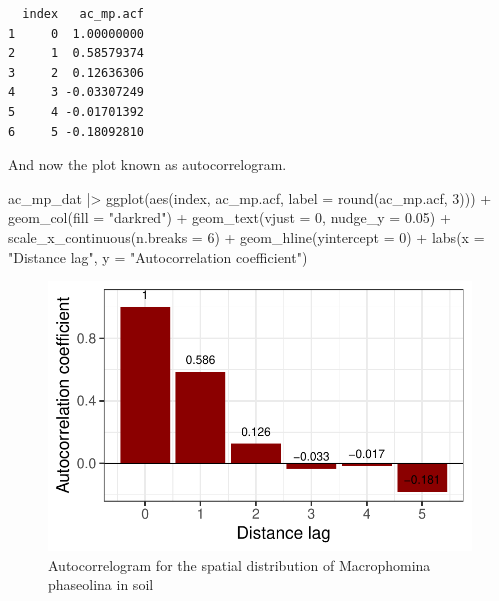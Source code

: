 \documentclass[
  letterpaper,
  DIV=11,
  numbers=noendperiod]{scrreprt}
\newenvironment{Shaded}{\begin{snugshade}}{\end{snugshade}}
\newcommand{\AttributeTok}[1]{\textcolor[rgb]{0.40,0.45,0.13}{#1}}
\newcommand{\DecValTok}[1]{\textcolor[rgb]{0.68,0.00,0.00}{#1}}
\newcommand{\FloatTok}[1]{\textcolor[rgb]{0.68,0.00,0.00}{#1}}
\newcommand{\FunctionTok}[1]{\textcolor[rgb]{0.28,0.35,0.67}{#1}}
\newcommand{\NormalTok}[1]{\textcolor[rgb]{0.00,0.23,0.31}{#1}}
\newcommand{\SpecialCharTok}[1]{\textcolor[rgb]{0.37,0.37,0.37}{#1}}
\newcommand{\StringTok}[1]{\textcolor[rgb]{0.13,0.47,0.30}{#1}}
\begin{document}
\begin{verbatim}
  index   ac_mp.acf
1     0  1.00000000
2     1  0.58579374
3     2  0.12636306
4     3 -0.03307249
5     4 -0.01701392
6     5 -0.18092810
\end{verbatim}

And now the plot known as autocorrelogram.

\begin{Shaded}
\begin{Highlighting}[]
\NormalTok{ac\_mp\_dat }\SpecialCharTok{|\textgreater{}}
  \FunctionTok{ggplot}\NormalTok{(}\FunctionTok{aes}\NormalTok{(index, ac\_mp.acf, }\AttributeTok{label =} \FunctionTok{round}\NormalTok{(ac\_mp.acf, }\DecValTok{3}\NormalTok{))) }\SpecialCharTok{+}
  \FunctionTok{geom\_col}\NormalTok{(}\AttributeTok{fill =} \StringTok{"darkred"}\NormalTok{) }\SpecialCharTok{+}
  \FunctionTok{geom\_text}\NormalTok{(}\AttributeTok{vjust =} \DecValTok{0}\NormalTok{, }\AttributeTok{nudge\_y =} \FloatTok{0.05}\NormalTok{) }\SpecialCharTok{+}
  \FunctionTok{scale\_x\_continuous}\NormalTok{(}\AttributeTok{n.breaks =} \DecValTok{6}\NormalTok{) }\SpecialCharTok{+}
  \FunctionTok{geom\_hline}\NormalTok{(}\AttributeTok{yintercept =} \DecValTok{0}\NormalTok{) }\SpecialCharTok{+}
  \FunctionTok{labs}\NormalTok{(}\AttributeTok{x =} \StringTok{"Distance lag"}\NormalTok{, }\AttributeTok{y =} \StringTok{"Autocorrelation coefficient"}\NormalTok{)}
\end{Highlighting}
\end{Shaded}

\begin{figure}[H]

{\centering \includegraphics{spatial-tests_files/figure-pdf/fig-autocorrel-1.pdf}

}

\caption{\label{fig-autocorrel}Autocorrelogram for the spatial
distribution of Macrophomina phaseolina in soil}

\end{figure}
\end{document}

